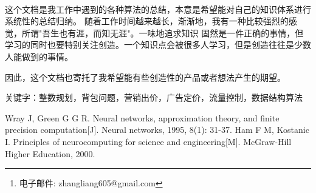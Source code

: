\documentclass[a4paper, 12pt, centering]{article}
\title{\yihao{工作中高优算法总结}}
\author{\xiaoerhao{zhangliang605}\footnote{电子邮件: zhangliang605@gmail.com}\\[2ex]
\sanhao{} DATOUBANG.INC\\[2ex]
}
\date{\sanhao\today}
\begin{document}
\linespread{1.5}








\
\vspace{10cm}
\begingroup
\let\newpage\relax%
\maketitle
\endgroup
\newpage



\par 这个文档是我工作中遇到的各种算法的总结，本意是希望能对自己的知识体系进行系统性的总结归纳。
随着工作时间越来越长，渐渐地，我有一种比较强烈的感觉，所谓"吾生也有涯，而知无涯"。一味地追求知识
固然是一件正确的事情，但学习的同时也要特别关注创造。一个知识点会被很多人学习，但是创造往往是少数
人能做到的事情。
\par 因此，这个文档也寄托了我希望能有些创造性的产品或者想法产生的期望。
\par 

\par 关键字：整数规划，背包问题，营销出价，广告定价，流量控制，数据结构算法
\newpage

\tableofcontents
\newpage



\begin{thebibliography}{1}
 Wray J, Green G G R. Neural networks, approximation theory, and 
finite precision computation[J]. Neural networks, 1995, 8(1): 31-37.
\bibitem{2} Ham F M, Kostanic I. Principles of neurocomputing for science and 
engineering[M]. McGraw-Hill Higher Education, 2000.
\end{thebibliography}
\end{document}
